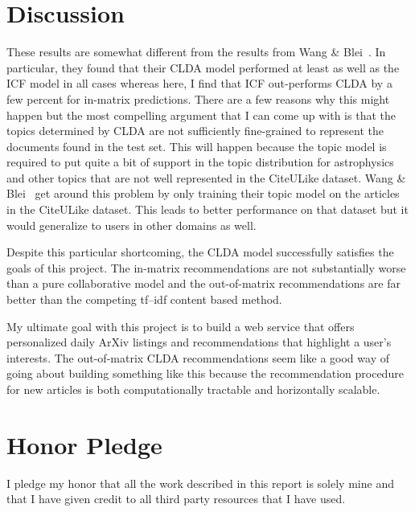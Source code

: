 \documentclass[11pt]{article}
\begin{document}
\section{Discussion}

These results are somewhat different from the results from Wang \&
Blei~.
In particular, they found that their CLDA model performed at least as well as
the ICF model in all cases whereas here, I find that ICF out-performs CLDA by
a few percent for in-matrix predictions.
There are a few reasons why this might happen but the most compelling argument
that I can come up with is that the topics determined by CLDA are not
sufficiently fine-grained to represent the documents found in the test set.
This will happen because the topic model is required to put quite a bit of
support in the topic distribution for astrophysics and other topics that are
not well represented in the CiteULike dataset.
Wang \& Blei~ get around this problem by only training their
topic model on the articles in the CiteULike dataset.
This leads to better performance on that dataset but it would generalize to
users in other domains as well.

Despite this particular shortcoming, the CLDA model successfully satisfies the
goals of this project.
The in-matrix recommendations are not substantially worse than a pure
collaborative model and the out-of-matrix recommendations are far better than
the competing tf--idf content based method.

My ultimate goal with this project is to build a web service that offers
personalized daily ArXiv listings and recommendations that highlight a user's
interests.
The out-of-matrix CLDA recommendations seem like a good way of going about
building something like this because the recommendation procedure for new
articles is both computationally tractable and horizontally scalable.

\section{Honor Pledge}
I pledge my honor that all the work described in this report is solely mine
and that I have given credit to all third party resources that I have used.
\end{document}
